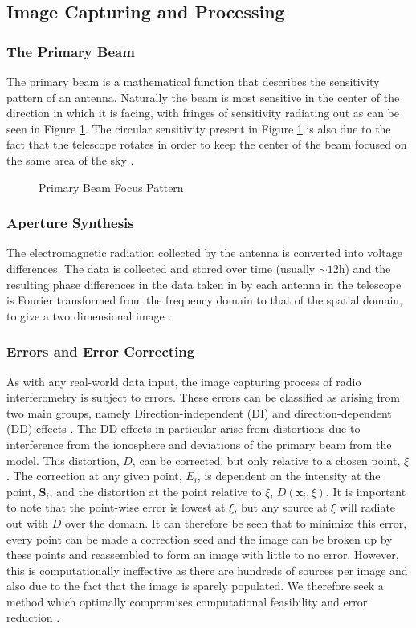 \subsection{Image Capturing and Processing}\label{ra:sec:ic}
%
\subsubsection{The Primary Beam}\label{ra:ssec:tpb}
The primary beam is a mathematical function that describes the sensitivity pattern of an antenna. Naturally the beam is most sensitive in the center of the direction in which it is facing, with fringes of sensitivity radiating out as can be seen in Figure \ref{ra:fig:beam}. The circular sensitivity present in Figure \ref{ra:fig:beam} is also due to the fact that the telescope rotates in order to keep the center of the beam focused on the same area of the sky \citep{oleg}.
%
\begin{figure}[H]
	\centering
	\caption{Primary Beam Focus Pattern \citep{oleg}}
	\label{ra:fig:beam}
\end{figure}
%
\subsubsection{Aperture Synthesis}\label{ra:ssec:rii}
The electromagnetic radiation collected by the antenna is converted into voltage differences. The data is collected and stored over time (usually $\sim12$h) and the resulting phase differences in the data taken in by each antenna in the telescope is Fourier transformed from the frequency domain to that of the spatial domain, to give a two dimensional image \citep{sault1994multi}.
%
\subsubsection{Errors and Error Correcting}\label{ra:ssec:eec}
As with any real-world data input, the image capturing process of radio interferometry is subject to errors. These errors can be classified as arising from two main groups, namely Direction-independent (DI) and direction-dependent (DD) effects \citep{smirnov2015radio}. The DD-effects in particular arise from distortions due to interference from the ionosphere and deviations of the primary beam from the model. This distortion, $D$, can be corrected, but only relative to a chosen point, $\xi$. The correction at any given point, $E_i$, is dependent on the intensity at the point, $\boldsymbol{S}_i$, and the distortion at the point relative to $\xi$, $D(\boldsymbol{x}_i,\xi)$. It is important to note that the point-wise error is lowest at $\xi$, but any source at $\xi$ will radiate out with $D$ over the domain. It can therefore be seen that to minimize this error, every point can be made a correction seed and the image can be broken up by these points and reassembled to form an image with little to no error. However, this is computationally ineffective as there are hundreds of sources per image and also due to the fact that the image is sparely populated. We therefore seek a method which optimally compromises computational feasibility and error reduction \citep{oleg}.
